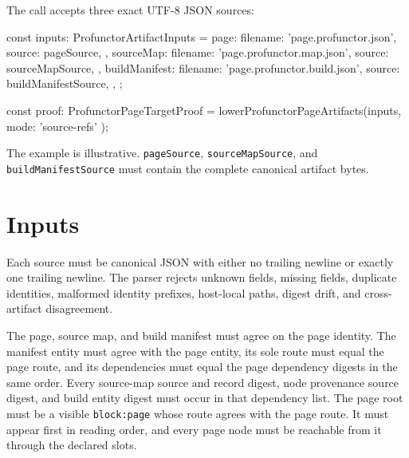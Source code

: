The call accepts three exact UTF-8 JSON sources:

\begin{CodeBlock}
const inputs: ProfunctorArtifactInputs = {
  page: {
    filename: 'page.profunctor.json',
    source: pageSource,
  },
  sourceMap: {
    filename: 'page.profunctor.map.json',
    source: sourceMapSource,
  },
  buildManifest: {
    filename: 'page.profunctor.build.json',
    source: buildManifestSource,
  },
};

const proof: ProfunctorPageTargetProof =
  lowerProfunctorPageArtifacts(inputs, { mode: 'source-refs' });
\end{CodeBlock}

The example is illustrative. \texttt{p\allowbreak{}a\allowbreak{}g\allowbreak{}e\allowbreak{}S\allowbreak{}o\allowbreak{}u\allowbreak{}r\allowbreak{}c\allowbreak{}e}, \texttt{s\allowbreak{}o\allowbreak{}u\allowbreak{}r\allowbreak{}c\allowbreak{}e\allowbreak{}M\allowbreak{}a\allowbreak{}p\allowbreak{}S\allowbreak{}o\allowbreak{}u\allowbreak{}r\allowbreak{}c\allowbreak{}e}, and \texttt{b\allowbreak{}u\allowbreak{}i\allowbreak{}l\allowbreak{}d\allowbreak{}M\allowbreak{}a\allowbreak{}n\allowbreak{}i\allowbreak{}f\allowbreak{}e\allowbreak{}s\allowbreak{}t\allowbreak{}S\allowbreak{}o\allowbreak{}u\allowbreak{}r\allowbreak{}c\allowbreak{}e} must contain the complete canonical artifact bytes.

\section{Inputs}\label{record-025-inputs}



Each source must be canonical JSON with either no trailing newline or exactly one trailing newline. The parser rejects unknown fields, missing fields, duplicate identities, malformed identity prefixes, host-local paths, digest drift, and cross-artifact disagreement.

The page, source map, and build manifest must agree on the page identity. The manifest entity must agree with the page entity, its sole route must equal the page route, and its dependencies must equal the page dependency digests in the same order. Every source-map source and record digest, node provenance source digest, and build entity digest must occur in that dependency list. The page root must be a visible \texttt{b\allowbreak{}l\allowbreak{}o\allowbreak{}c\allowbreak{}k\allowbreak{}:\allowbreak{}p\allowbreak{}a\allowbreak{}g\allowbreak{}e} whose route agrees with the page route. It must appear first in reading order, and every page node must be reachable from it through the declared slots.

